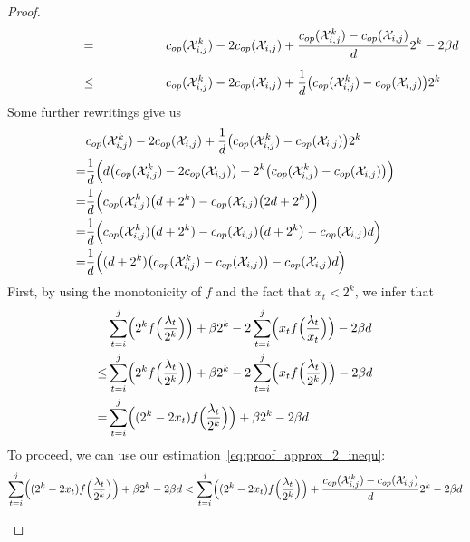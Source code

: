 \begin{proof}
\begin{align*}
	\stackrel{\phantom{\eqref{eq:proof_approx_2_inequ}}}{=}&\opcosts(\mx_{i,j}^k)-2\opcosts(\mx_{i,j})+\frac{\opcosts(\mx_{i,j}^k)-\opcosts(\mx_{i,j})}{d}2^k-2\beta d\\
	\stackrel{\phantom{\eqref{eq:proof_approx_2_inequ}}}{\le}&\opcosts(\mx_{i,j}^k)-2\opcosts(\mx_{i,j})+\frac{1}{d}\bigl(\opcosts(\mx_{i,j}^k)-\opcosts(\mx_{i,j})\bigr)2^k
\end{align*}
Some further rewritings give us
\begin{align*}
	&c_{op}(\mathcal{X}_{i,j}^k)-2c_{op}(\mathcal{X}_{i,j})+\frac{1}{d}\bigl(c_{op}(\mathcal{X}_{i,j}^k)-c_{op}(\mathcal{X}_{i,j})\bigr)2^k\\
	=&\frac{1}{d}\Bigl(d\bigl(c_{op}(\mathcal{X}_{i,j}^k)-2c_{op}(\mathcal{X}_{i,j})\bigr)+2^k\bigl(c_{op}(\mathcal{X}_{i,j}^k)-c_{op}(\mathcal{X}_{i,j})\bigr)\Bigr)\\
	=&\frac{1}{d}\Bigl(c_{op}(\mathcal{X}_{i,j}^k)\bigl(d+2^k)-c_{op}(\mathcal{X}_{i,j})\bigl(2d+2^k\bigr)\Bigr)\\
	=&\frac{1}{d}\Bigl(c_{op}(\mathcal{X}_{i,j}^k)\bigl(d+2^k)-c_{op}(\mathcal{X}_{i,j})\bigl(d+2^k\bigr)-c_{op}(\mathcal{X}_{i,j})d\Bigr)\\
	=&\frac{1}{d}\Bigl((d+2^k)\bigl(c_{op}(\mathcal{X}_{i,j}^k)-c_{op}(\mathcal{X}_{i,j})\bigr)-c_{op}(\mathcal{X}_{i,j})d\Bigr)
\end{align*}
First, by using the monotonicity of $f$ and the fact that $x_t<2^k$, we infer that
\begin{align*}
	&\sum_{t=i}^j\Bigl(2^kf\Bigl(\frac{\lambda_t}{2^k}\Bigr)\Bigr)+\beta2^k-2\sum_{t=i}^j\Bigl(x_tf\Bigl(\frac{\lambda_t}{x_t}\Bigr)\Bigr)-2\beta d\\
	\le&\sum_{t=i}^j\Bigl(2^kf\Bigl(\frac{\lambda_t}{2^k}\Bigr)\Bigr)+\beta2^k-2\sum_{t=i}^j\Bigl(x_tf\Bigl(\frac{\lambda_t}{2^k}\Bigr)\Bigr)-2\beta d\\
	=&\sum_{t=i}^j\Bigl((2^k-2x_t)f\Bigl(\frac{\lambda_t}{2^k}\Bigr)\Bigr)+\beta2^k-2\beta d
\end{align*}
To proceed, we can use our estimation~\eqref{eq:proof_approx_2_inequ}:
\begin{align*}
	\sum_{t=i}^j\Bigl((2^k-2x_t)f\Bigl(\frac{\lambda_t}{2^k}\Bigr)\Bigr)+\beta2^k-2\beta d<\sum_{t=i}^j\Bigl((2^k-2x_t)f\Bigl(\frac{\lambda_t}{2^k}\Bigr)\Bigr)+\frac{c_{op}(\mathcal{X}_{i,j}^k)-c_{op}(\mathcal{X}_{i,j})}{d}2^k-2\beta d
\end{align*}
\begin{figure}[H]
\captionsetup[subfigure]{labelformat=empty}
\begin{subfigure}[b]{0.47\textwidth}
	

\end{subfigure}
\end{figure}
\end{proof}
